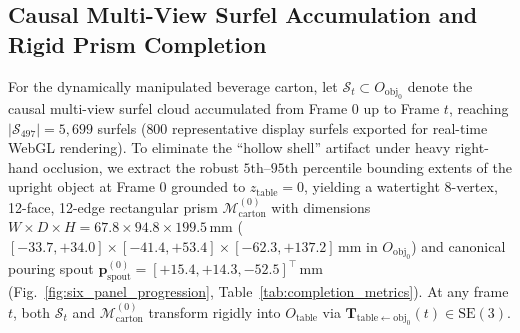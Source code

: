 \documentclass[10pt,journal]{IEEEtran}
\begin{document}
\subsection{Causal Multi-View Surfel Accumulation and Rigid Prism Completion}
For the dynamically manipulated beverage carton, let $\mathcal{S}_t \subset O_{\mathrm{obj}_0}$ denote the causal multi-view surfel cloud accumulated from Frame 0 up to Frame $t$, reaching $|\mathcal{S}_{497}| = 5{,}699$ surfels ($800$ representative display surfels exported for real-time WebGL rendering). To eliminate the ``hollow shell'' artifact under heavy right-hand occlusion, we extract the robust $5\text{th}$--$95\text{th}$ percentile bounding extents of the upright object at Frame 0 grounded to $z_{\mathrm{table}}=0$, yielding a watertight 8-vertex, 12-face, 12-edge rectangular prism $\mathcal{M}_{\mathrm{carton}}^{(0)}$ with dimensions $W \times D \times H = 67.8 \times 94.8 \times 199.5\,\mathrm{mm}$ ($[-33.7, +34.0] \times [-41.4, +53.4] \times [-62.3, +137.2]\,\mathrm{mm}$ in $O_{\mathrm{obj}_0}$) and canonical pouring spout $\mathbf{p}_{\mathrm{spout}}^{(0)} = [+15.4, +14.3, -52.5]^\top\,\mathrm{mm}$ (Fig.~\ref{fig:six_panel_progression}, Table~\ref{tab:completion_metrics}). At any frame $t$, both $\mathcal{S}_t$ and $\mathcal{M}_{\mathrm{carton}}^{(0)}$ transform rigidly into $O_{\mathrm{table}}$ via $\mathbf{T}_{\mathrm{table}\leftarrow \mathrm{obj}_0}(t) \in \mathrm{SE}(3)$.

\begin{table}[t]
    \centering
    \caption{Reconstructed 3D Functional Scene Primitives and Geometric Specifications in $O_{\mathrm{table}}$}
    \label{tab:completion_metrics}
    \scriptsize
\end{table}
\end{document}
